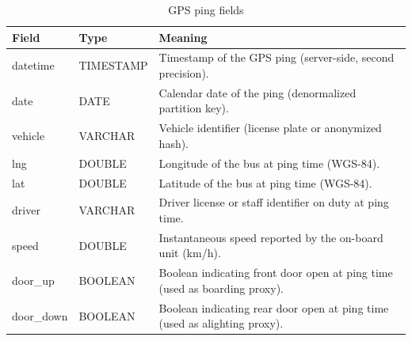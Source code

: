 \begin{table}[!htbp]
\centering
\caption{GPS ping fields}
\label{tab:fields:gps}
\footnotesize
\begin{tabularx}{\linewidth}{p{2.6cm} p{2.0cm} X}
\hline
\textbf{Field} & \textbf{Type} & \textbf{Meaning} \\
\hline
datetime & TIMESTAMP & Timestamp of the GPS ping (server-side, second precision). \\
date & DATE & Calendar date of the ping (denormalized partition key). \\
vehicle & VARCHAR & Vehicle identifier (license plate or anonymized hash). \\
lng & DOUBLE & Longitude of the bus at ping time (WGS-84). \\
lat & DOUBLE & Latitude of the bus at ping time (WGS-84). \\
driver & VARCHAR & Driver license or staff identifier on duty at ping time. \\
speed & DOUBLE & Instantaneous speed reported by the on-board unit (km/h). \\
door\_up & BOOLEAN & Boolean indicating front door open at ping time (used as boarding proxy). \\
door\_down & BOOLEAN & Boolean indicating rear door open at ping time (used as alighting proxy). \\
\hline
\end{tabularx}
\end{table}

